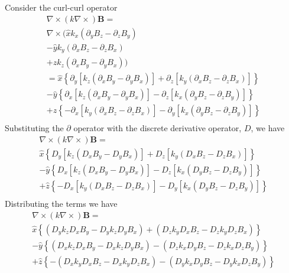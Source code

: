 \documentclass[11pt]{article}
\begin{document}
Consider the curl-curl operator
\begin{multline}
  \nabla \times (k \nabla \times) \mathbf{B} = \\
  \nabla \times (
  \hat{x} k_x (\partial_y B_z - \partial_z B_y) \\
  - \hat{y} k_y (\partial_x B_z - \partial_z B_x) \\
  + \hat{z} k_z (\partial_x B_y - \partial_y B_x) ) \\  =
   \hat{x} \left\{ \partial_y \left[ k_z (\partial_x B_y - \partial_y B_x) \right] +
    \partial_z \left[ k_y (\partial_x B_z - \partial_z B_x) \right] \right\} \\
  -\hat{y} \left\{ \partial_x \left[ k_z (\partial_x B_y - \partial_y B_x) \right] -
   \partial_z \left[ k_x (\partial_y B_z - \partial_z B_y) \right]  \right\} \\
  +\hat{z} \left\{ -\partial_x \left[ k_y (\partial_x B_z - \partial_z B_x) \right] -
   \partial_y \left[ k_x (\partial_y B_z - \partial_z B_y) \right]  \right\} \\
\end{multline}
Substituting the $\partial$ operator with the discrete derivative operator, $D$, we have
\begin{multline}
  \nabla \times (k \nabla \times) \mathbf{B} = \\
   \hat{x} \left\{ D_y \left[ k_z (D_x B_y - D_y B_x) \right] +
    D_z \left[ k_y (D_x B_z - D_z B_x) \right] \right\} \\
  -\hat{y} \left\{ D_x \left[ k_z (D_x B_y - D_y B_x) \right] -
   D_z \left[ k_x (D_y B_z - D_z B_y) \right]  \right\} \\
  +\hat{z} \left\{ -D_x \left[ k_y (D_x B_z - D_z B_x) \right] -
   D_y \left[ k_x (D_y B_z - D_z B_y) \right]  \right\} \\
\end{multline}
Distributing the terms we have
\begin{multline}
  \nabla \times (k \nabla \times) \mathbf{B} = \\
   \hat{x} \left\{   (D_y k_z D_x B_y - D_y k_z D_y B_x)   +  (D_z k_y D_x B_z - D_z k_y D_z B_x) \right\} \\
  -\hat{y} \left\{   (D_x k_z D_x B_y - D_x k_z D_y B_x)   -  (D_z k_x D_y B_z - D_z k_x D_z B_y) \right\} \\
  +\hat{z} \left\{ - (D_x k_y D_x B_z - D_x k_y D_z B_x)   -  (D_y k_x D_y B_z - D_y k_x D_z B_y) \right\} \\
\end{multline}
\end{document}
